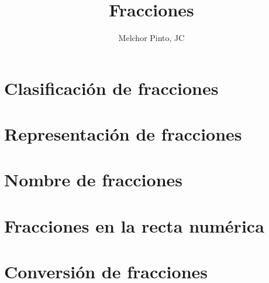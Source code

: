 \documentclass{guia}
\title{Fracciones}
\author{Melchor Pinto, JC}
\begin{document}
%
\begin{questions}
\section{Clasificación de fracciones}
\questionboxed{}
\section{Representación de fracciones}
\questionboxed{}
\section{Nombre de fracciones}
\questionboxed{}
\section{Fracciones en la recta numérica}
\questionboxed{}
\section{Conversión de fracciones}
\questionboxed{}


\end{questions}
\end{document}
